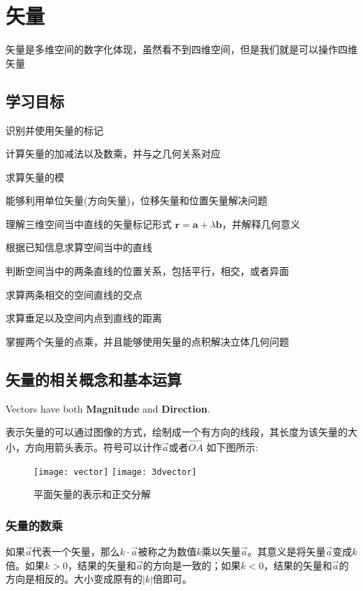 \chapter{矢量}
矢量是多维空间的数字化体现，虽然看不到四维空间，但是我们就是可以操作四维矢量

\section*{学习目标}
\begin{todolist}
 \item 识别并使用矢量的标记
 \item 计算矢量的加减法以及数乘，并与之几何关系对应
 \item 求算矢量的模
 \item 能够利用单位矢量(方向矢量)，位移矢量和位置矢量解决问题
 \item 理解三维空间当中直线的矢量标记形式 $\mathbf{r}=\mathbf{a}+\lambda\mathbf{b}$，并解释几何意义
 \item 根据已知信息求算空间当中的直线
 \item 判断空间当中的两条直线的位置关系，包括平行，相交，或者异面
 \item 求算两条相交的空间直线的交点
 \item 求算垂足以及空间内点到直线的距离
 \item 掌握两个矢量的点乘，并且能够使用矢量的点积解决立体几何问题
\end{todolist}
\clearpage

\section{矢量的相关概念和基本运算}
\begin{definition}
Vectors have both \textbf{Magnitude} and \textbf{Direction}.
\end{definition}
表示矢量的可以通过图像的方式，绘制成一个有方向的线段，其长度为该矢量的大小，方向用箭头表示。符号可以计作$\vec{a}$或者$\overrightarrow{OA}$
如下图所示:
\begin{figure}[H]
\centering
\texttt{[image: vector]}
\texttt{[image: 3dvector]}
\label{fig:vectors}
\caption{平面矢量的表示和正交分解}
\end{figure}

\subsection*{矢量的数乘}
如果$\vec{a}$代表一个矢量，那么$k\cdot \vec{a}$被称之为数值$k$乘以矢量$\vec{a}$。其意义是将矢量$\vec{a}$变成$k$倍。如果$k>0$，结果的矢量和$\vec{a}$的方向是一致的；如果$k<0$，结果的矢量和$\vec{a}$的方向是相反的。大小变成原有的$|k|$倍即可。


